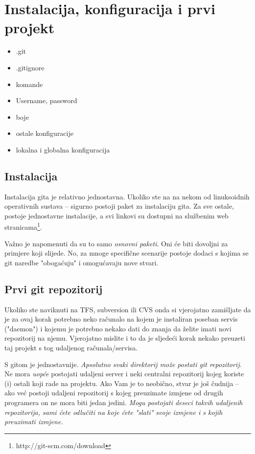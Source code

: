 \chapter*{Instalacija, konfiguracija i prvi projekt}

\begin{itemize}
   \item .git
   \item .gitignore
   \item komande
   \item Username, password
   \item boje
   \item ostale konfiguracije
   \item lokalna i globalna konfiguracija
\end{itemize}

\section*{Instalacija}

Instalacija gita je relativno jednostavna. Ukoliko ste na na nekom od linuksoidnih operativnih sustava -- sigurno postoji paket za instalaciju gita. 
Za sve ostale, postoje jednostavne instalacije, a svi linkovi su dostupni na službenim web stranicama\footnote{http://git-scm.com/download}.

Važno je napomenuti da su to samo \emph{osnovni paketi}. 
Oni će biti dovoljni za primjere koji slijede. 
No, za mnoge specifične scenarije postoje dodaci s kojima se git naredbe "obogaćuju" i omogućavaju nove stvari.

\section*{Prvi git repozitorij}

Ukoliko ste naviknuti na TFS, subversion ili CVS onda si vjerojatno zamišljate da je za ovaj korak potrebno neko računalo na kojem je instaliran poseban servis ("daemon") i kojemu je potrebno nekako dati do znanja da želite imati novi repozitorij na njemu.
Vjerojatno mislite i to da je sljedeći korak nekako preuzeti taj projekt s tog udaljenog računala/servisa.

S gitom je jednostavnije. 
\emph{Apsolutno svaki direktorij može postati git repozitorij.}
Ne mora \emph{uopće} postojati udaljeni server i neki centralni repozitorij kojeg koriste (i) ostali koji rade na projektu.
Ako Vam je to neobično, stvar je još čudnija -- ako već postoji udaljeni repozitorij s kojeg preuzimate izmjene od drugih programera on ne mora biti jedan jedini.
\emph{Mogu postojati deseci takvih udaljenih repozitorija, sami ćete odlučiti na koje ćete "slati" svoje izmjene i s kojih preuzimati izmjene.}

